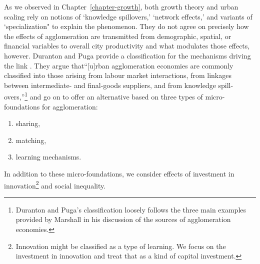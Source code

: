 \documentclass[a4paper]{article}
\theoremstyle{definition}
\theoremstyle{plain}
\begin{document}
As we observed in Chapter~\ref{chapter-growth}, both growth theory and urban scaling rely on %
notions of `knowledge spillovers,' `network effects,' and variants of `specialization" to explain the phenomenon.  They do not agree on precisely how the effects of agglomeration are transmitted from demographic, spatial, or financial variables to overall city productivity and what modulates those effects, however. Duranton and Puga %
provide a classification for the mechanisms driving the link \cite{durantonMicroFoundationsUrbanAgglomeration2004}.  They argue that``[u]rban agglomeration economies are commonly classified into those arising from labour market interactions, from linkages between intermediate- and final-goods suppliers, and from knowledge spill-overs,''\footnote{Duranton and Puga's classification loosely follows the three main examples provided by Marshall \cite{marshallPrinciplesEconomics1890} in his discussion of the sources of agglomeration economies.} and go on to offer an alternative based on three types of micro-foundations for agglomeration:
\begin{enumerate}
\item sharing,
\item matching, 
\item learning mechanisms.
\end{enumerate}
In addition to these micro-foundations, we consider effects of investment in innovation\footnote{Innovation might be classified as a type of learning. We focus on the investment in innovation and treat that as a kind of capital investment.} and social inequality.
\end{document}
